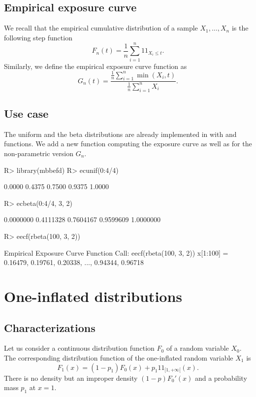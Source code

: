 \documentclass[article, nojss]{jss}
\newcommand{\ind}{1\!\!1}
\begin{document}
\subsection{Empirical exposure curve}
We recall that the empirical cumulative distribution of a sample $X_1,\dots, X_n$ is 
the following step function
$$
F_n(t) = \frac{1}{n} \sum_{i=1}^n \ind_{X_i\leq t}.
$$
Similarly, we define the empirical exposure curve function as
$$
G_n(t) = \frac{\frac{1}{n} \sum_{i=1}^n \min(X_i, t)}{\frac{1}{n} \sum_{i=1}^n X_i}.
$$

\subsection{Use case}
The uniform and the beta distributions are already implemented in  
with  and   functions.
We add a new function computing the exposure curve as well as for the non-parametric version $G_n$.

\begin{Schunk}
\begin{Sinput}
R> library(mbbefd)
R> ecunif(0:4/4)
\end{Sinput}
\begin{Soutput}
[1] 0.0000 0.4375 0.7500 0.9375 1.0000
\end{Soutput}
\begin{Sinput}
R> ecbeta(0:4/4, 3, 2)
\end{Sinput}
\begin{Soutput}
[1] 0.0000000 0.4111328 0.7604167 0.9599609 1.0000000
\end{Soutput}
\begin{Sinput}
R> eecf(rbeta(100, 3, 2))
\end{Sinput}
\begin{Soutput}
Empirical Exposure Curve Function 
Call: eecf(rbeta(100, 3, 2))
 x[1:100] = 0.16479, 0.19761, 0.20338,  ..., 0.94344, 0.96718
\end{Soutput}
\end{Schunk}



\section{One-inflated distributions}\label{sec:oidistr:generic}

\subsection{Characterizations}\label{sec:oidistr:generic:charac}
Let us consider a continuous distribution function $F_0$ of a random variable $X_0$. 
The corresponding distribution function of the one-inflated random variable $X_1$ is 
$$
F_1(x) = (1-p_1) F_0(x) + p_1 \ind_{[1,+\infty[}(x).
$$
There is no density but an improper density $(1-p)F_0'(x)$ and a probability mass $p_1$ at $x=1$.
\end{document}
